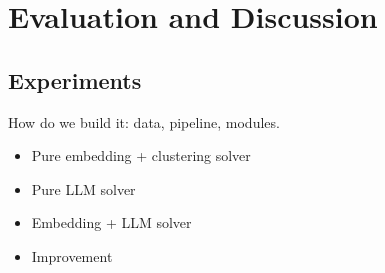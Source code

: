 \chapter{Evaluation and Discussion}
\label{ch:evaluation}



\section{Experiments}



How do we build it: data, pipeline, modules.

\begin{itemize}
    \item Pure embedding + clustering solver
    \item Pure LLM solver
    \item Embedding + LLM solver
    \item Improvement
\end{itemize}
